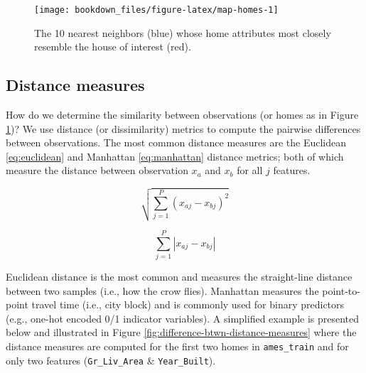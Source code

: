 \documentclass[]{krantz}
\begin{document}
\begin{figure}

{\centering \texttt{[image: bookdown\_files/figure-latex/map-homes-1]} 

}

\caption{The 10 nearest neighbors (blue) whose home attributes most closely resemble the house of interest (red).}\label{fig:map-homes}
\end{figure}

\hypertarget{knn-distance}{%
\subsection{Distance measures}\label{knn-distance}}

How do we determine the similarity between observations (or homes as in Figure \ref{fig:map-homes})? We use distance (or dissimilarity) metrics to compute the pairwise differences between observations. The most common distance measures are the Euclidean \eqref{eq:euclidean} and Manhattan \eqref{eq:manhattan} distance metrics; both of which measure the distance between observation \(x_a\) and \(x_b\) for all \(j\) features.

\begin{equation}
\label{eq:euclidean}
 \sqrt{\sum^P_{j=1}(x_{aj} - x_{bj})^2}
\end{equation}

\begin{equation}
\label{eq:manhattan}
 \sum^P_{j=1} | x_{aj} - x_{bj} | 
\end{equation}

Euclidean distance is the most common and measures the straight-line distance between two samples (i.e., how the crow flies). Manhattan measures the point-to-point travel time (i.e., city block) and is commonly used for binary predictors (e.g., one-hot encoded 0/1 indicator variables). A simplified example is presented below and illustrated in Figure \ref{fig:difference-btwn-distance-measures} where the distance measures are computed for the first two homes in \texttt{ames\_train} and for only two features (\texttt{Gr\_Liv\_Area} \& \texttt{Year\_Built}).
\end{document}
